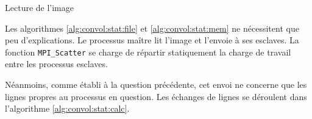 \begin{algorithm}[t]
  \caption{Lecture de l'image}
  \label{alg:convol:stat:file}



\end{algorithm}

Les algorithmes \ref{alg:convol:stat:file} et
\ref{alg:convol:stat:mem} ne nécessitent que peu d'explications. Le
processus maître lit l'image et l'envoie à ses esclaves. La fonction
\texttt{MPI\_Scatter} se charge de répartir statiquement la charge de
travail entre les processus esclaves.

Néanmoins, comme établi à la question précédente, cet envoi ne
concerne que les lignes propres au processus en question. Les échanges
de lignes se déroulent dans l'algorithme \ref{alg:convol:stat:calc}.


